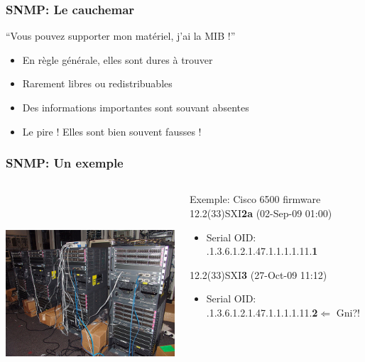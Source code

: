 \documentclass{beamer}
\begin{document}
\begin{frame}
    \frametitle{SNMP: Le cauchemar}

    \begin{block}{“Vous pouvez supporter mon matériel, j'ai la MIB !”}

    \pause
    \begin{itemize}
    \item En règle générale, elles sont dures à trouver
    \item Rarement libres ou redistribuables
    \item Des informations importantes sont souvant absentes
    \item Le pire ! Elles sont bien souvent fausses !
    \end{itemize}
    \end{block}

\end{frame}
\begin{frame}
    \frametitle{SNMP: Un exemple}

 \begin{columns}
 \begin{column}{0.35\textwidth}
         \includegraphics[height=7.5cm]{./pics/cisco.jpg}
 \end{column}
 \begin{column}{0.65\textwidth}
    \begin{block}{Exemple: Cisco 6500 firmware}
    12.2(33)SXI\textbf{2a} (02-Sep-09 01:00)
    \begin{itemize}
    \item Serial OID: .1.3.6.1.2.1.47.1.1.1.1.11.\textbf{1}
    \end{itemize}
    12.2(33)SXI\textbf{3} (27-Oct-09 11:12)
    \begin{itemize}
    \item Serial OID: .1.3.6.1.2.1.47.1.1.1.1.11.\textbf{2}$\Longleftarrow$ Gni?!
    \end{itemize}
    \end{block}

 \end{column}
\end{columns}


    
\end{frame}
\end{document}
